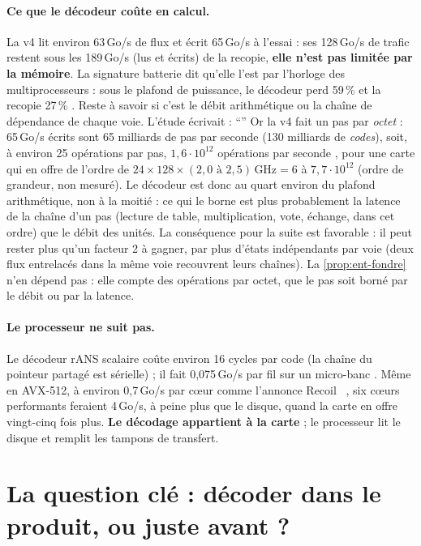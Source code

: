 \paragraph{Ce que le décodeur coûte en calcul.} La v4 lit environ 63\,Go/s de flux et écrit 65\,Go/s à l'essai : ses 128\,Go/s de trafic restent sous les 189\,Go/s (lus et écrits) de la recopie, \textbf{elle n'est pas limitée par la mémoire}. La signature batterie dit qu'elle l'est par l'horloge des multiprocesseurs : sous le plafond de puissance, le décodeur perd 59\,\% et la recopie 27\,\% \mes. Reste à savoir si c'est le débit arithmétique ou la chaîne de dépendance de chaque voie. L'étude écrivait : \enquote{} Or la v4 fait un pas par \emph{octet} : 65\,Go/s écrits sont 65 milliards de pas par seconde (130 milliards de \emph{codes}), soit, à environ 25 opérations par pas, $1{,}6\cdot10^{12}$ opérations par seconde \calc, pour une carte qui en offre de l'ordre de $24 \times 128 \times (2{,}0 \text{ à } 2{,}5)\,\text{GHz} = 6$ à $7{,}7\cdot10^{12}$ (ordre de grandeur, non mesuré). Le décodeur est donc au quart environ du plafond arithmétique, non à la moitié : ce qui le borne est plus probablement la latence de la chaîne d'un pas (lecture de table, multiplication, vote, échange, dans cet ordre) que le débit des unités. La conséquence pour la suite est favorable : il peut rester plus qu'un facteur 2 à gagner, par plus d'états indépendants par voie (deux flux entrelacés dans la même voie recouvrent leurs chaînes). La \cref{prop:ent-fondre} n'en dépend pas : elle compte des opérations par octet, que le pas soit borné par le débit ou par la latence.

\paragraph{Le processeur ne suit pas.} Le décodeur rANS scalaire coûte environ 16 cycles par code (la chaîne du pointeur partagé est sérielle) ; il fait 0,075\,Go/s par fil sur un micro-banc \mes. Même en AVX-512, à environ 0,7\,Go/s par cœur comme l'annonce Recoil~\cite{lin2023recoil} \litt, six cœurs performants feraient 4\,Go/s, à peine plus que le disque, quand la carte en offre vingt-cinq fois plus. \textbf{Le décodage appartient à la carte} ; le processeur lit le disque et remplit les tampons de transfert.

\section{La question clé : décoder dans le produit, ou juste avant ?}\label{sec:ent-question}

